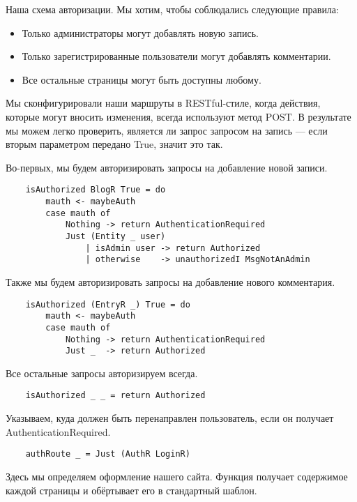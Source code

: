 Наша схема авторизации. Мы хотим, чтобы соблюдались следующие правила:

\begin{itemize}
\item Только администраторы могут добавлять новую запись. 
\item Только зарегистрированные пользователи могут добавлять комментарии. 
\item Все остальные страницы могут быть доступны любому.
\end{itemize}

Мы сконфигурировали наши маршруты в RESTful-стиле, когда действия, которые могут вносить изменения, всегда используют метод POST. В результате мы можем легко проверить, является ли запрос запросом на запись --- если вторым параметром передано True, значит это так.

Во-первых, мы будем авторизировать запросы на добавление новой записи. 
 
\begin{lstlisting}
    isAuthorized BlogR True = do
        mauth <- maybeAuth
        case mauth of
            Nothing -> return AuthenticationRequired
            Just (Entity _ user)
                | isAdmin user -> return Authorized
                | otherwise    -> unauthorizedI MsgNotAnAdmin
\end{lstlisting}

Также мы будем авторизировать запросы на добавление нового комментария. 
 
\begin{lstlisting}
    isAuthorized (EntryR _) True = do
        mauth <- maybeAuth
        case mauth of
            Nothing -> return AuthenticationRequired
            Just _  -> return Authorized
\end{lstlisting}
 
Все остальные запросы авторизируем всегда.
 
\begin{lstlisting}
    isAuthorized _ _ = return Authorized
\end{lstlisting}
 
Указываем, куда должен быть перенаправлен пользователь, если он получает AuthenticationRequired. 
 
\begin{lstlisting}
    authRoute _ = Just (AuthR LoginR)
\end{lstlisting}
 
Здесь мы определяем оформление нашего сайта. Функция получает содержимое каждой страницы и обёртывает его в стандартный шаблон. 
 
